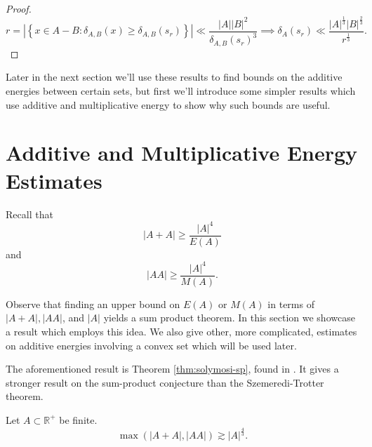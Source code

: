 \documentclass[12pt,reqno]{amsart}
\begin{document}
\begin{proof}
\[
    r = \left\lvert \left\{ x \in A-B : \delta _{A,B} (x) \geq \delta_{A,B} (s _{r} ) \right\}  \right\rvert \ll \frac{\left\lvert A \right\rvert \left\lvert B \right\rvert ^{2} }{\delta_{A,B} (s _{r} )^{3} } \implies \delta_{A} (s _{r} ) \ll \frac{\left\lvert A \right\rvert ^{\frac{1}{3} } \left\lvert B \right\rvert ^{\frac{2}{3} }}{r^{\frac{1}{3} }}
.\]
\end{proof}

Later in the next section we'll use these results to find bounds on the additive
energies between certain sets, but first we'll introduce some simpler results which
use additive and multiplicative energy to show why such bounds are useful.

\section{Additive and Multiplicative Energy Estimates}

Recall that
\[
    \left\lvert A + A \right\rvert \geq  \frac{\left\lvert A \right\rvert ^{4}}{ E(A) }
\]
and
\[
    \left\lvert AA \right\rvert \geq \frac{\left\lvert A \right\rvert ^{4}}{M(A) }
.\]

Observe that finding an upper bound on \(E(A)\) or \(M(A)\) in terms of \(\left\lvert A + A \right\rvert, \left\lvert AA \right\rvert    \), and \(\left\lvert A \right\rvert \)
yields a sum product theorem. In this section we showcase a result which employs this idea.
We also give other, more complicated, estimates on additive energies involving a convex set which
will be used later.

The aforementioned result is Theorem \ref{thm:solymosi-sp}, found in \cite{Solymosi}. It gives a stronger result
on the sum-product conjecture than the Szemeredi-Trotter theorem. 
\begin{theorem*}
Let \(A \subset \mathbb{R}^{+} \) be finite.
\[
    \max \left( \left\lvert A+A \right\rvert , \left\lvert AA \right\rvert  \right) \gtrsim  \left\lvert A \right\rvert ^{\frac{4}{3}}
.\]
\end{theorem*}
\end{document}
